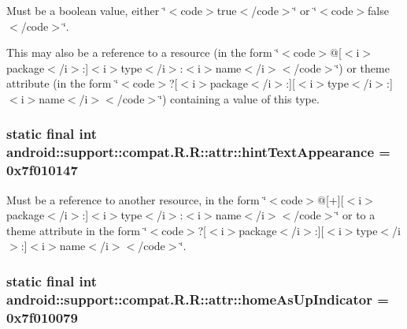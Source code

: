 Must be a boolean value, either \char`\"{}$<$code$>$true$<$/code$>$\char`\"{} or \char`\"{}$<$code$>$false$<$/code$>$\char`\"{}. 

This may also be a reference to a resource (in the form \char`\"{}$<$code$>$@\mbox{[}$<$i$>$package$<$/i$>$:\mbox{]}$<$i$>$type$<$/i$>$:$<$i$>$name$<$/i$>$$<$/code$>$\char`\"{}) or theme attribute (in the form \char`\"{}$<$code$>$?\mbox{[}$<$i$>$package$<$/i$>$:\mbox{]}\mbox{[}$<$i$>$type$<$/i$>$:\mbox{]}$<$i$>$name$<$/i$>$$<$/code$>$\char`\"{}) containing a value of this type. \hypertarget{classandroid_1_1support_1_1compat_1_1_r_1_1attr_8d06e49f740419f7f9d1e5475417c652}{
\subsubsection[{hintTextAppearance}]{\setlength{\rightskip}{0pt plus 5cm}static final int android::support::compat.R.R::attr::hintTextAppearance = 0x7f010147}}
\label{classandroid_1_1support_1_1compat_1_1_r_1_1attr_8d06e49f740419f7f9d1e5475417c652}


Must be a reference to another resource, in the form \char`\"{}$<$code$>$@\mbox{[}+\mbox{]}\mbox{[}$<$i$>$package$<$/i$>$:\mbox{]}$<$i$>$type$<$/i$>$:$<$i$>$name$<$/i$>$$<$/code$>$\char`\"{} or to a theme attribute in the form \char`\"{}$<$code$>$?\mbox{[}$<$i$>$package$<$/i$>$:\mbox{]}\mbox{[}$<$i$>$type$<$/i$>$:\mbox{]}$<$i$>$name$<$/i$>$$<$/code$>$\char`\"{}. \hypertarget{classandroid_1_1support_1_1compat_1_1_r_1_1attr_e60e591b79b96bd9e140f19397ee259e}{
\subsubsection[{homeAsUpIndicator}]{\setlength{\rightskip}{0pt plus 5cm}static final int android::support::compat.R.R::attr::homeAsUpIndicator = 0x7f010079}}
\label{classandroid_1_1support_1_1compat_1_1_r_1_1attr_e60e591b79b96bd9e140f19397ee259e}


